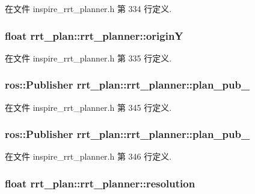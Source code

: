 在文件 inspire\-\_\-rrt\-\_\-planner.\-h 第 334 行定义.

\hypertarget{classrrt__plan_1_1rrt__planner_a5cfa182b92acb4e370ba19a213a0c22a}{
\subsubsection[{origin\-Y}]{\setlength{\rightskip}{0pt plus 5cm}float rrt\-\_\-plan\-::rrt\-\_\-planner\-::origin\-Y}}\label{classrrt__plan_1_1rrt__planner_a5cfa182b92acb4e370ba19a213a0c22a}


在文件 inspire\-\_\-rrt\-\_\-planner.\-h 第 335 行定义.

\hypertarget{classrrt__plan_1_1rrt__planner_a6beed3a62613c7e24813416185d12929}{
\subsubsection[{plan\-\_\-pub\-\_\-}]{\setlength{\rightskip}{0pt plus 5cm}ros\-::\-Publisher rrt\-\_\-plan\-::rrt\-\_\-planner\-::plan\-\_\-pub\-\_\-}}\label{classrrt__plan_1_1rrt__planner_a6beed3a62613c7e24813416185d12929}


在文件 inspire\-\_\-rrt\-\_\-planner.\-h 第 345 行定义.

\hypertarget{classrrt__plan_1_1rrt__planner_a142a2d4c28bcaa2798493accf32690ee}{
\subsubsection[{plan\-\_\-pub\-\_\-2}]{\setlength{\rightskip}{0pt plus 5cm}ros\-::\-Publisher rrt\-\_\-plan\-::rrt\-\_\-planner\-::plan\-\_\-pub\-\_}}\label{classrrt__plan_1_1rrt__planner_a142a2d4c28bcaa2798493accf32690ee}


在文件 inspire\-\_\-rrt\-\_\-planner.\-h 第 346 行定义.

\hypertarget{classrrt__plan_1_1rrt__planner_ad23ca65f53176297ae7e9f40c7edeb69}{
\subsubsection[{resolution}]{\setlength{\rightskip}{0pt plus 5cm}float rrt\-\_\-plan\-::rrt\-\_\-planner\-::resolution}}\label{classrrt__plan_1_1rrt__planner_ad23ca65f53176297ae7e9f40c7edeb69}


